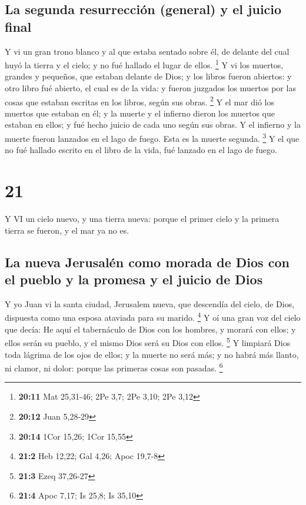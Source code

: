 \hypertarget{la-segunda-resurrecciuxf3n-general-y-el-juicio-final}{%
\subsection{La segunda resurrección (general) y el juicio
final}\label{la-segunda-resurrecciuxf3n-general-y-el-juicio-final}}

 Y vi un gran trono blanco y al que estaba sentado sobre
él, de delante del cual huyó la tierra y el cielo; y no fué hallado el
lugar de ellos. \footnote{\textbf{20:11} Mat 25,31-46; 2Pe 3,7; 2Pe
  3,10; 2Pe 3,12}  Y vi los muertos, grandes y pequeños,
que estaban delante de Dios; y los libros fueron abiertos: y otro libro
fué abierto, el cual es de la vida: y fueron juzgados los muertos por
las cosas que estaban escritas en los libros, según sus obras.
\footnote{\textbf{20:12} Juan 5,28-29}  Y el mar dió los
muertos que estaban en él; y la muerte y el infierno dieron los muertos
que estaban en ellos; y fué hecho juicio de cada uno según sus obras.
 Y el infierno y la muerte fueron lanzados en el lago de
fuego. Esta es la muerte segunda. \footnote{\textbf{20:14} 1Cor 15,26;
  1Cor 15,55}  Y el que no fué hallado escrito en el libro
de la vida, fué lanzado en el lago de fuego.

\hypertarget{section-20}{%
\section{21}\label{section-20}}

 Y VI un cielo nuevo, y una tierra nueva: porque el primer
cielo y la primera tierra se fueron, y el mar ya no es.

\hypertarget{la-nueva-jerusaluxe9n-como-morada-de-dios-con-el-pueblo-y-la-promesa-y-el-juicio-de-dios}{%
\subsection{La nueva Jerusalén como morada de Dios con el pueblo y la
promesa y el juicio de
Dios}\label{la-nueva-jerusaluxe9n-como-morada-de-dios-con-el-pueblo-y-la-promesa-y-el-juicio-de-dios}}

 Y yo Juan vi la santa ciudad, Jerusalem nueva, que
descendía del cielo, de Dios, dispuesta como una esposa ataviada para su
marido. \footnote{\textbf{21:2} Heb 12,22; Gal 4,26; Apoc 19,7-8}
 Y oí una gran voz del cielo que decía: He aquí el
tabernáculo de Dios con los hombres, y morará con ellos; y ellos serán
su pueblo, y el mismo Dios será su Dios con ellos. \footnote{\textbf{21:3}
  Ezeq 37,26-27}  Y limpiará Dios toda lágrima de los ojos
de ellos; y la muerte no será más; y no habrá más llanto, ni clamor, ni
dolor: porque las primeras cosas son pasadas. \footnote{\textbf{21:4}
  Apoc 7,17; Is 25,8; Is 35,10}

